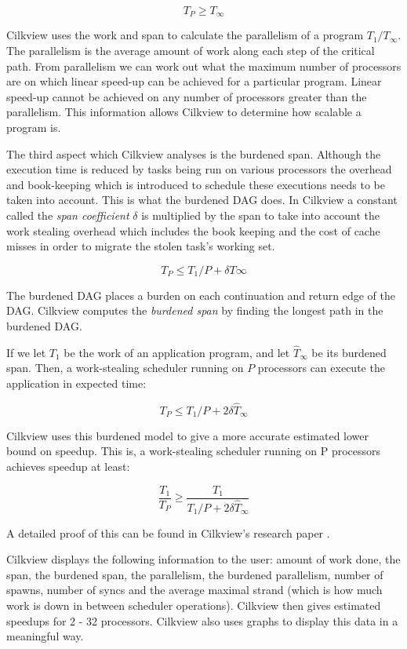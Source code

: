 \[T_P \geq T_\infty\]

Cilkview uses the work and span to calculate the parallelism of a program \(T_1/T_\infty\). The parallelism is the average amount of work along each step of the critical path. From parallelism we can work out what the maximum number of processors are on which linear speed-up can be achieved for a particular program. Linear speed-up cannot be achieved on any number of processors greater than the parallelism. This information allows Cilkview to determine how scalable a program is. 

The third aspect which Cilkview analyses is the burdened span. Although the execution time is reduced by tasks being run on various processors the overhead and book-keeping which is introduced to schedule these executions needs to be taken into account. This is what the burdened DAG does. In Cilkview a constant called the \emph{span coefficient} \(\delta\) is multiplied by the span to take into account the work stealing overhead which includes the book keeping and the cost of cache misses in order to migrate the stolen task's working set.

\[T_P \leq T_1/P+\delta T \infty\]

The burdened DAG places a burden on each continuation and return edge of the DAG. Cilkview computes the \emph{burdened span} by finding the longest path in the burdened DAG. 

If we let \(T_1\) be the work of an application program, and let \(\hat{T}_\infty\) be its burdened span. Then, a work-stealing scheduler running on \(P\) processors can execute the application in expected time:

\[T_P \leq T_1 / P+2 \delta \hat{T}_\infty\]

Cilkview uses this burdened model to give a more accurate estimated lower bound on speedup. This is, a work-stealing scheduler running on P processors achieves speedup at least:

\[\frac{T_1}{T_P}\geq\frac{T_1}{T_1/P+2 \delta \hat{T}_\infty}\]

A detailed proof of this can be found in Cilkview's research paper \citep{id8}.

Cilkview displays the following information to the user: amount of work done, the span, the burdened span, the parallelism, the burdened parallelism, number of spawns, number of syncs and the average maximal strand (which is how much work is down in between scheduler operations). Cilkview then gives estimated speedups for 2 - 32 processors. Cilkview also uses graphs to display this data in a meaningful way.

